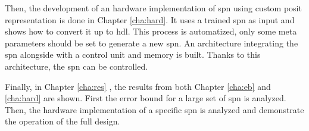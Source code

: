 Then, the development of an hardware implementation of \gls{spn} using custom posit representation is done in Chapter \ref{cha:hard}. It uses a trained \gls{spn} as input and shows how to convert it up to \gls{hdl}. This process is automatized, only some meta parameters should be set to generate a new \gls{spn}. An architecture integrating the \gls{spn} alongside with a control unit and memory is built. Thanks to this architecture, the \gls{spn} can be controlled.

Finally, in Chapter \ref{cha:res} , the results from both Chapter \ref{cha:eb} and \ref{cha:hard} are shown. First the error bound for a large set of \gls{spn} is analyzed. Then, the hardware implementation of a specific \gls{spn} is analyzed and demonstrate the operation of the full design.
